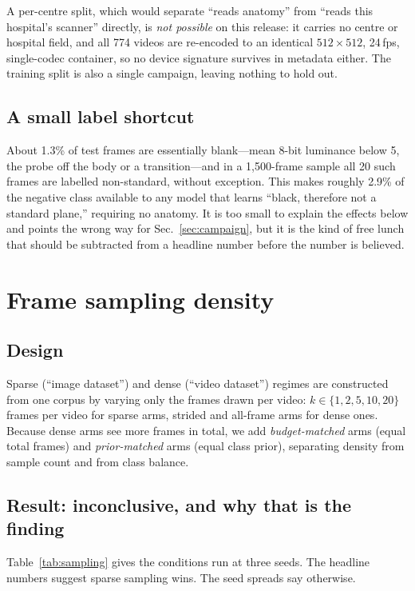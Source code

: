 \documentclass[conference]{IEEEtran}
\begin{document}
A per-centre split, which would separate ``reads anatomy'' from ``reads this
hospital's scanner'' directly, is \emph{not possible} on this release: it
carries no centre or hospital field, and all 774 videos are re-encoded to an
identical $512\times512$, 24\,fps, single-codec container, so no device
signature survives in metadata either. The training split is also a single
campaign, leaving nothing to hold out.

\subsection{A small label shortcut}

About 1.3\% of test frames are essentially blank---mean 8-bit luminance below
5, the probe off the body or a transition---and in a 1{,}500-frame sample all
20 such frames are labelled non-standard, without exception. This makes roughly
2.9\% of the negative class available to any model that learns ``black,
therefore not a standard plane,'' requiring no anatomy. It is too small to
explain the effects below and points the wrong way for Sec.~\ref{sec:campaign},
but it is the kind of free lunch that should be subtracted from a headline
number before the number is believed.

\section{Frame sampling density}
\label{sec:sampling}

\subsection{Design}

Sparse (``image dataset'') and dense (``video dataset'') regimes are
constructed from one corpus by varying only the frames drawn per video:
$k\in\{1,2,5,10,20\}$ frames per video for sparse arms, strided and all-frame
arms for dense ones. Because dense arms see more frames in total, we add
\emph{budget-matched} arms (equal total frames) and \emph{prior-matched} arms
(equal class prior), separating density from sample count and from class
balance.

\subsection{Result: inconclusive, and why that is the finding}

Table~\ref{tab:sampling} gives the conditions run at three seeds. The headline
numbers suggest sparse sampling wins. The seed spreads say otherwise.
\end{document}
